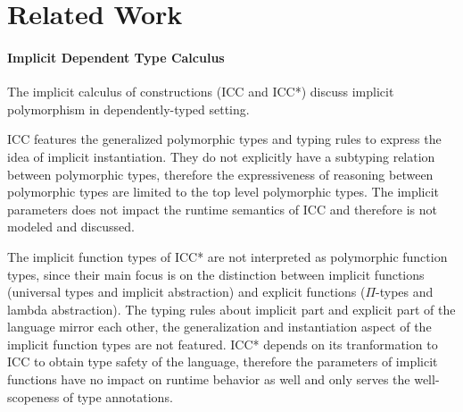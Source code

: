 \section{Related Work}

\paragraph{Implicit Dependent Type Calculus}

The implicit calculus of constructions (ICC\cite{miquel2001implicit} and
ICC*\cite{barras2008implicit}) discuss implicit polymorphism in dependently-typed
setting.

ICC features the generalized polymorphic types and typing rules to express
the idea of implicit instantiation. They do not explicitly have a subtyping
relation between polymorphic types, therefore the expressiveness of reasoning
between polymorphic types are limited to the top level polymorphic types. The
implicit parameters does not impact the runtime semantics of ICC and therefore
is not modeled and discussed.

The implicit function types of ICC* are not interpreted as polymorphic
function types, since their main focus is on the distinction between implicit
functions (universal types and implicit abstraction) and explicit functions
($\Pi$-types and lambda abstraction).
The typing rules about implicit part and explicit part of the language mirror
each other, the generalization and instantiation aspect of the implicit function
types are not featured. ICC* depends on its tranformation to ICC to obtain type safety
of the language, therefore the parameters of implicit functions have no impact
on runtime behavior as well and only serves the well-scopeness of type annotations.

